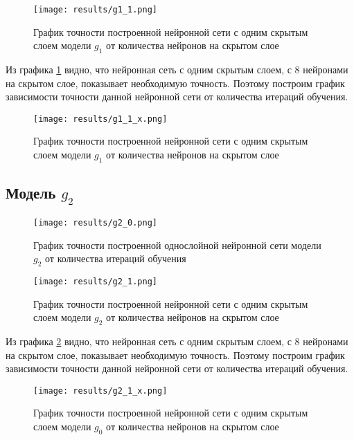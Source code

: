 \begin{figure}[H]
	\texttt{[image: results/g1\_1.png]}
	
	\caption{График точности построенной нейронной сети с одним скрытым слоем модели $g_1$ от количества нейронов на скрытом слое}
	\label{graphic1}
\end{figure}

Из графика \ref{graphic1} видно, что нейронная сеть с одним скрытым слоем, с 8 нейронами на скрытом слое, показывает необходимую точность. Поэтому построим график зависимости точности данной нейронной сети от количества итераций обучения.

\begin{figure}[H]
	\texttt{[image: results/g1\_1\_x.png]}
	
	\caption{График точности построенной нейронной сети с одним скрытым слоем модели $g_1$ от количества нейронов на скрытом слое}
\end{figure}

\subsection{Модель $g_2$}
\begin{figure}[H]
	\texttt{[image: results/g2\_0.png]}
	
	\caption{График точности построенной однослойной нейронной сети модели $g_2$ от количества итераций обучения}
	
\end{figure}


\begin{figure}[H]
	\texttt{[image: results/g2\_1.png]}
	
	\caption{График точности построенной нейронной сети с одним скрытым слоем модели $g_2$ от количества нейронов на скрытом слое}
	\label{graphic2}
\end{figure}

Из графика \ref{graphic2} видно, что нейронная сеть с одним скрытым слоем, с 8 нейронами на скрытом слое, показывает необходимую точность. Поэтому построим график зависимости точности данной нейронной сети от количества итераций обучения.

\begin{figure}[H]
	\texttt{[image: results/g2\_1\_x.png]}
	
	\caption{График точности построенной нейронной сети с одним скрытым слоем модели $g_0$ от количества нейронов на скрытом слое}
\end{figure}


